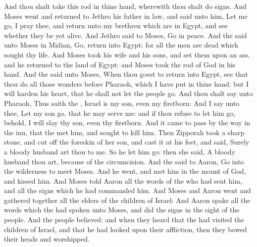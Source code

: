 \begin{biblechapter}
\verse And thou shalt take this rod in thine hand, wherewith thou shalt do signs.
 And Moses went and returned to Jethro his father in law, and said unto him, Let me go, I pray thee, and return unto my brethren which are in Egypt, and see whether they be yet alive. And Jethro said to Moses, Go in peace.
\verse And the \LORD said unto Moses in Midian, Go, return into Egypt: for all the men are dead which sought thy life.
\verse And Moses took his wife and his sons, and set them upon an ass, and he returned to the land of Egypt: and Moses took the rod of God in his hand.
\verse And the \LORD said unto Moses, When thou goest to return into Egypt, see that thou do all those wonders before Pharaoh, which I have put in thine hand: but I will harden his heart, that he shall not let the people go.
\verse And thou shalt say unto Pharaoh, Thus saith the \LORD, Israel is my son, even my firstborn:
\verse And I say unto thee, Let my son go, that he may serve me: and if thou refuse to let him go, behold, I will slay thy son, even thy firstborn.
\verse And it came to pass by the way in the inn, that the \LORD met him, and sought to kill him.
\verse Then Zipporah took a sharp stone, and cut off the foreskin of her son, and cast it at his feet, and said, Surely a bloody husband art thou to me.
\verse So he let him go: then she said, A bloody husband thou art, because of the circumcision.
\verse And the \LORD said to Aaron, Go into the wilderness to meet Moses. And he went, and met him in the mount of God, and kissed him.
\verse And Moses told Aaron all the words of the \LORD who had sent him, and all the signs which he had commanded him.
\verse And Moses and Aaron went and gathered together all the elders of the children of Israel:
\verse And Aaron spake all the words which the \LORD had spoken unto Moses, and did the signs in the sight of the people.
\verse And the people believed: and when they heard that the \LORD had visited the children of Israel, and that he had looked upon their affliction, then they bowed their heads and worshipped.
\end{biblechapter}

